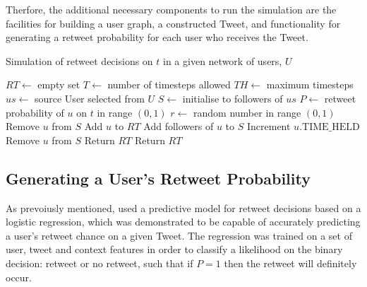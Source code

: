 Therfore, the additional necessary components to run the simulation are the facilities for building a user graph, a constructed Tweet, and functionality for generating a retweet probability for each user who receives the Tweet.

\begin{algorithm}
\caption{Simulation of retweet decisions on $t$ in a given network of users, $U$}
\begin{algorithmic}[1]
    \State $RT\gets$ empty set 
    \State $T\gets$ number of timesteps allowed
    \State $TH\gets$ maximum timesteps 
    \State $us\gets$ source User selected from $U$
    \State $S\gets$ initialise to followers of $us$
    \Statex %
            \State $P\gets$ retweet probability of $u$ on $t$ in range $(0,1)$
            \State $r\gets$ random number in range $(0,1)$
                \State Remove $u$ from $S$
                \State Add $u$ to $RT$
                \State Add followers of $u$ to $S$
            \Else
                \State Increment $u.\textrm{TIME\_HELD}$
                    \State Remove $u$ from $S$ 
                \EndIf
            \EndIf
        \EndFor
            \State Return $RT$ 
        \EndIf
    \EndFor
    \State Return $RT$
\EndProcedure
\end{algorithmic}
\label{algo1}
\end{algorithm}


\subsection{Generating a User's Retweet Probability} 
As prevoiusly mentioned, \cite{zhu11} used a predictive model for retweet decisions based on a logistic regression, which was demonstrated to be capable of accurately predicting a user's retweet chance on a given Tweet. The regression was trained on a set of user, tweet and context features in order to classify a likelihood on the binary decision: retweet or no retweet, such that if $P = 1$ then the retweet will definitely occur.


